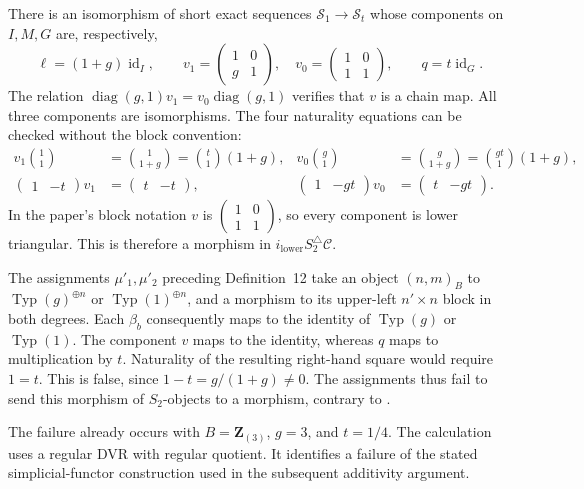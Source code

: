 \documentclass[11pt,a4paper]{amsart}
\numberwithin{equation}{section}
\theoremstyle{definition}
\theoremstyle{remark}
\newcommand{\Z}{\mathbf Z}
\begin{document}
There is an isomorphism of short exact sequences
$\mathcal S_1\to\mathcal S_t$ whose components on $I,M,G$ are,
respectively,
\[
\ell=(1+g)\operatorname{id}_I,\qquad
v_1=\begin{pmatrix}1&0\\g&1\end{pmatrix},\quad
v_0=\begin{pmatrix}1&0\\1&1\end{pmatrix},\qquad
q=t\operatorname{id}_G.
\]
The relation $\operatorname{diag}(g,1)v_1
=v_0\operatorname{diag}(g,1)$ verifies that $v$ is a chain map.
All three components are isomorphisms. The four naturality equations
can be checked without the block convention:
\begin{align*}
v_1\binom11&=\binom{1}{1+g}
             =\binom t1(1+g),&
v_0\binom g1&=\binom{g}{1+g}
             =\binom{gt}{1}(1+g),\\
\begin{pmatrix}1&-t\end{pmatrix}v_1
 &=\begin{pmatrix}t&-t\end{pmatrix},&
\begin{pmatrix}1&-gt\end{pmatrix}v_0
 &=\begin{pmatrix}t&-gt\end{pmatrix}.
\end{align*}
In the paper's block notation $v$ is
$\begin{pmatrix}1&0\\1&1\end{pmatrix}$, so every component is
lower triangular. This is therefore a morphism in
$i_{\mathrm{lower}}S_2^{\triangle}\mathcal C$.

The assignments $\mu'_1,\mu'_2$ preceding Definition~12 take an
object $(n,m)_B$ to $\operatorname{Typ}(g)^{\oplus n}$ or
$\operatorname{Typ}(1)^{\oplus n}$, and a morphism to its upper-left
$n'\times n$ block in both degrees. Each $\beta_b$ consequently
maps to the identity of $\operatorname{Typ}(g)$ or
$\operatorname{Typ}(1)$. The component $v$ maps to the identity,
whereas $q$ maps to multiplication by $t$. Naturality of the
resulting right-hand square would require $1=t$. This is false,
since $1-t=g/(1+g)\ne0$. The assignments thus fail to send this
morphism of $S_2$-objects to a morphism, contrary to
\cite[Lemma~13(III)]{MochizukiParameters}.

The failure already occurs with $B=\Z_{(3)}$, $g=3$, and $t=1/4$.
The calculation uses a regular DVR with regular quotient. It identifies
a failure of the stated simplicial-functor construction used in the
subsequent additivity argument.
\end{document}

